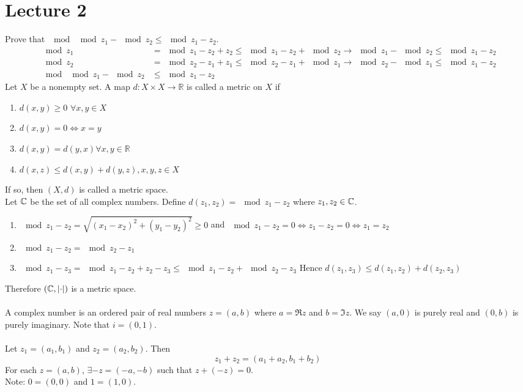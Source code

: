 \documentclass[12pt]{article}
\begin{document}
\section{Lecture 2} 
Prove that $\mod{\mod{z_1} - \mod{z_2}} \leq \mod{z_1 - z_2}$. $$ \begin{aligned} 
\mod{z_1} &= \mod{z_1 - z_2 + z_2} \leq \mod{z_1 - z_2} + \mod{z_2} \to \mod{z_1} - \mod{z_2} \leq \mod{z_1 - z_2} \\ \mod{z_2} &= \mod{z_2 - z_1 + z_1} \leq \mod{z_2 - z_1} + \mod{z_1} \to \mod{z_2} - \mod{z_1} \leq \mod{z_1 - z_2} \\ \mod{\mod{z_1} - \mod{z_2}} &\leq \mod{z_1 - z_2} \end{aligned} $$ 
Let $X$ be a nonempty set. A map $d: X \times X \to \mathbb{R}$ is called a metric on $X$ if \begin{enumerate} 
\item $d(x,y) \geq 0$ $\forall x,y \in X$ 
\item $d(x,y) = 0 \iff x = y$
\item $d(x,y) = d(y,x) \forall x,y \in \mathbb{R}$
\item $d(x,z) \leq d(x,y) + d(y,z), x,y,z \in X$ \end{enumerate} 
If so, then $(X,d)$ is called a metric space. \\
Let $\mathbb{C}$ be the set of all complex numbers. Define $d(z_1,z_2) = \mod{z_1 - z_2}$ where $z_1,z_2 \in \mathbb{C}$. \begin{enumerate} 
\item $\mod{z_1 - z_2} = \sqrt{(x_1 - x_2)^2 + (y_1 - y_2)^2} \geq 0 $ and $\mod{z_1 - z_2} = 0 \iff z_1 - z_2 = 0 \iff z_1 = z_2$
\item $\mod{z_1 - z_2} = \mod{z_2 - z_1}$ 
\item $\mod{z_1 - z_3} = \mod{z_1 - z_2 + z_2 - z_3} \leq \mod{z_1 - z_2} + \mod{z_2 - z_3} $ Hence $d(z_1,z_3) \leq d(z_1,z_2) + d(z_2,z_3)$ \end{enumerate} 
Therefore $(\mathbb{C}, \abs{\cdot})$ is a metric space. \\~\\
A complex number is an ordered pair of real numbers $z = (a,b)$ where $a = \Re{z}$ and $b = \Im{z}$. We say $(a,0)$ is purely real and $(0,b)$ is purely imaginary. Note that $i = (0,1)$. \\~\\
Let $z_1 = (a_1,b_1)$ and $z_2 = (a_2,b_2)$. Then $$z_1 + z_2 = (a_1+a_2,b_1+b_2)$$ For each $z = (a,b)$, $\exists -z = (-a,-b)$ such that $z + (-z) = 0$. \\ Note: $0 = (0,0)$ and $1 = (1,0)$. \\
\end{document}
